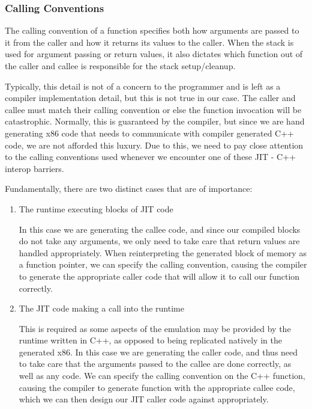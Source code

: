 \subsubsection{Calling Conventions}
\label{section:calling-convs}

The calling convention of a function specifies both how arguments are passed to it from the caller and how it returns its values to the caller. When the stack is used for argument passing or return values, it also dictates which function out of the caller and callee is responsible for the stack setup/cleanup.

Typically, this detail is not of a concern to the programmer and is left as a compiler implementation detail, but this is not true in our case. The caller and callee must match their calling convention or else the function invocation will be catastrophic. Normally, this is guaranteed by the compiler, but since we are hand generating x86 code that needs to communicate with compiler generated C++ code, we are not afforded this luxury. Due to this, we need to pay close attention to the calling conventions used whenever we encounter one of these JIT - C++ interop barriers.

Fundamentally, there are two distinct cases that are of importance:
\begin{enumerate}
    \item The runtime executing blocks of JIT code
    
    In this case we are generating the callee code, and since our compiled blocks do not take any arguments, we only need to take care that return values are handled appropriately. When reinterpreting the generated block of memory as a function pointer, we can specify the calling convention, causing the compiler to generate the appropriate caller code that will allow it to call our function correctly.
    
    \item The JIT code making a call into the runtime
    
    This is required as some aspects of the emulation may be provided by the runtime written in C++, as opposed to being replicated natively in the generated x86. In this case we are generating the caller code, and thus need to take care that the arguments passed to the callee are done correctly, as well as any  code. We can specify the calling convention on the C++ function, causing the compiler to generate function with the appropriate callee code, which we can then design our JIT caller code against appropriately.
\end{enumerate}

